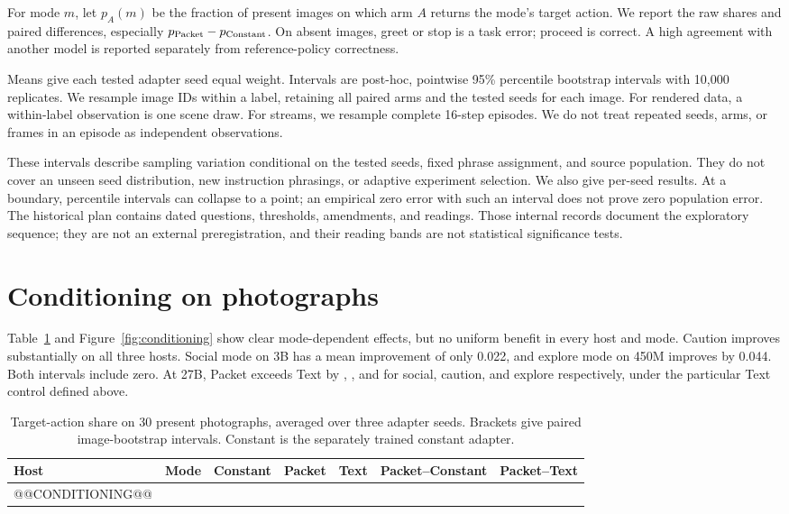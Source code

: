 \documentclass[10pt]{article}
\begin{document}
For mode $m$, let $p_A(m)$ be the fraction of present images on which
arm $A$ returns the mode's target action. We report the raw shares and
paired differences, especially $p_{\rm Packet}-p_{\rm Constant}$.
On absent images, greet or stop is a task error; proceed is correct.
A high agreement with another model is reported separately from
reference-policy correctness.

Means give each tested adapter seed equal weight. Intervals are
post-hoc, pointwise 95\% percentile bootstrap intervals with 10,000
replicates. We resample image IDs within a label, retaining all paired
arms and the tested seeds for each image. For rendered data, a
within-label observation is one scene draw. For streams, we resample
complete 16-step episodes. We do not treat repeated seeds, arms, or
frames in an episode as independent observations.

These intervals describe sampling variation conditional on the tested
seeds, fixed phrase assignment, and source population. They do not
cover an unseen seed distribution, new instruction phrasings, or
adaptive experiment selection. We also give per-seed results. At a
boundary, percentile intervals can collapse to a point; an empirical
zero error with such an interval does not prove zero population error.
The historical plan contains dated questions, thresholds, amendments,
and readings. Those internal records document the exploratory sequence;
they are not an external preregistration, and their reading bands are
not statistical significance tests.

\section{Conditioning on photographs}
Table~\ref{tab:conditioning} and Figure~\ref{fig:conditioning} show clear
mode-dependent effects, but no uniform benefit in every host and mode.
Caution improves substantially on all three hosts. Social mode on 3B
has a mean improvement of only 0.022, and explore mode on 450M improves
by 0.044. Both intervals include zero. At 27B, Packet exceeds Text
by \SocialVsText{}, \CautionVsText{}, and \ExploreVsText{} for social,
caution, and explore respectively, under the particular Text control
defined above.

\begin{table}[htbp]\centering\small
\caption{Target-action share on 30 present photographs, averaged over
three adapter seeds. Brackets give paired image-bootstrap intervals.
Constant is the separately trained constant adapter.}\label{tab:conditioning}
\begin{tabular}{llrrrll}\toprule
Host & Mode & Constant & Packet & Text & Packet--Constant & Packet--Text\\\midrule
@@CONDITIONING@@
\bottomrule\end{tabular}
\end{table}
\end{document}
